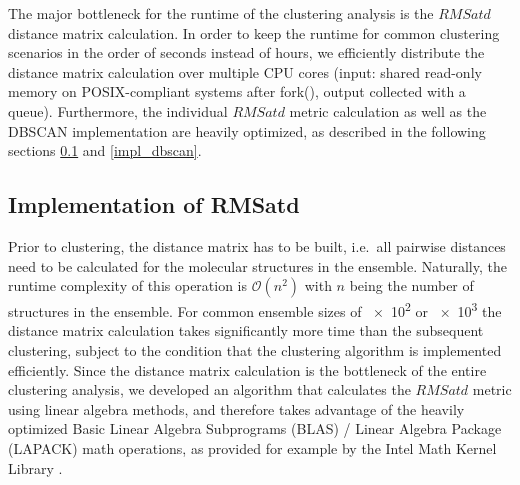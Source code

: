 The major bottleneck for the runtime of the clustering analysis is the $RMSatd$
distance matrix calculation. In order to keep the runtime for common clustering
scenarios in the order of seconds instead of hours, we efficiently distribute
the distance matrix calculation over multiple CPU cores (input: shared read-only
memory on POSIX-compliant systems after fork(), output collected with a queue).
Furthermore, the individual $RMSatd$ metric calculation as well as the DBSCAN
implementation are heavily optimized, as described in the following sections
\ref{impl_rmsatd} and \ref{impl_dbscan}.


\subsection{Implementation of RMSatd}
\label{impl_rmsatd}

Prior to clustering, the distance matrix has to be built, i.e.\ all pairwise
distances need to be calculated for the molecular structures in the ensemble.
Naturally, the runtime complexity of this operation is $\mathcal{O}(n^2)$ with
$n$ being the number of structures in the ensemble. For common ensemble sizes of
\num{e2} or \num{e3} the distance matrix calculation takes significantly more
time than the subsequent clustering, subject to the condition that the
clustering algorithm is implemented efficiently. Since the distance matrix
calculation is the bottleneck of the entire clustering analysis, we developed an
algorithm that calculates the $RMSatd$ metric using linear algebra methods, and
therefore takes advantage of the heavily optimized Basic Linear Algebra
Subprograms (BLAS) / Linear Algebra Package (LAPACK) math operations, as
provided for example by the Intel Math Kernel Library \cite{intel_mkl_2014}.

